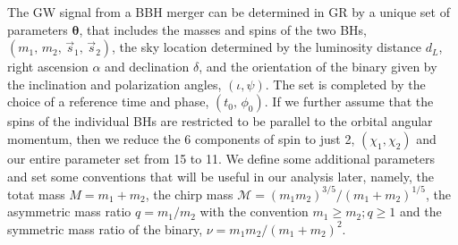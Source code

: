 \documentclass[twocolumn,
               prd,
               aps,
               superscriptaddress,
               tightenlines,
               nofootinbib,
               eqsecnum,
               amsfonts,
               amsmath,
               longbibliography]{revtex4-1}
\begin{document}
The GW signal from a BBH merger can be determined in GR by a unique set of parameters $\bm{\theta}$, that
includes the masses and spins of the two BHs, $(m_1,\, m_2,\, \vec{s}_1,\, \vec{s}_2)$, the sky location determined by the luminosity distance $d_L$, right ascension $\alpha$ and declination $\delta$, and the orientation of the binary given by the inclination and polarization angles, $(\iota, \psi)$. The set is completed by the choice of a reference time and phase, $(t_0,\, \phi_0)$. If we further assume that the spins of the individual BHs are restricted to be parallel to the orbital angular momentum, then we reduce the 6 components of spin to just 2, $(\chi_1, \chi_2)$ and our entire parameter set from 15 to 11. We define some additional parameters and set some conventions that will be useful in our analysis later, namely, the totat mass $M=m_1+m_2$, the chirp mass $\mathcal {M}=(m_{1}m_{2})^{3/5}/(m_{1}+m_{2})^{1/5}$, the asymmetric mass ratio $q=m_1/m_2$ with the convention $m_1 \geqslant m_2; q \geqslant 1$ and the symmetric mass ratio of the binary, $\nu = m_1m_2/(m_1+m_2)^2$.
\end{document}
